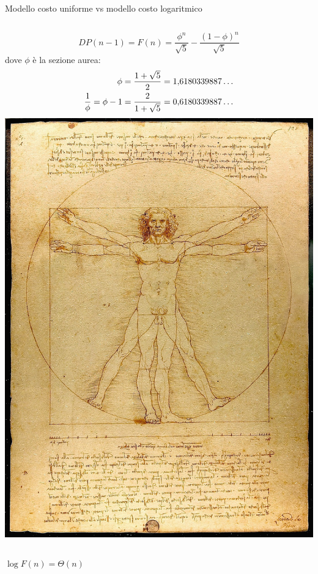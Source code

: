 \begin{frame}{Modello costo uniforme vs modello costo logaritmico}

\vspace{-9pt}
\begin{myboxtitle}
\vspace{6pt}
\begin{columns}[T]
\[
DP(n-1) = F(n) = \frac{\phi^n}{\sqrt{5}} - \frac{(1-\phi)^n}{\sqrt{5}} 
\]
dove $\phi$ è la \alert{sezione aurea}:
\begin{align*}
\phi &={1+\sqrt 5 \over 2}=1{,}6180339887\dots  \\
\frac{1}{\phi} = \phi - 1 & ={2 \over 1+\sqrt 5 }=0{,}6180339887\dots 
\end{align*}
\includegraphics[width=\textwidth]{vitruviano.jpg}
\end{columns}
\end{myboxtitle}


\begin{columns}[T]
\vspace{-6pt}
\pause
{}

\bigskip
\alert{$\log F(n) = \Theta(n)$}
\end{columns}

\end{frame}

